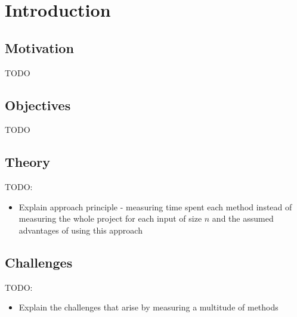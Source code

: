 \chapter{Introduction}

\section{Motivation}
TODO

\section{Objectives}
TODO

\section{Theory}
TODO:
\begin{itemize}
  \item Explain approach principle - measuring time spent each method instead of measuring the whole project for each input of size $n$ and the assumed advantages of using this approach
\end{itemize}

\section{Challenges}
TODO:
\begin{itemize}
  \item Explain the challenges that arise by measuring a multitude of methods
\end{itemize}
